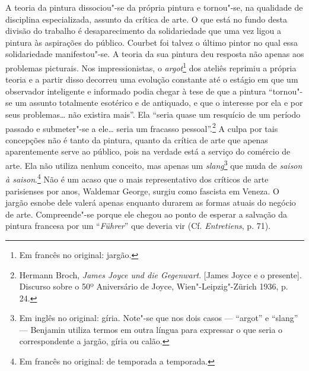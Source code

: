 A teoria da pintura dissociou"-se da própria pintura e tornou"-se, na
qualidade de disciplina especializada, assunto da crítica de arte. O que
está no fundo desta divisão do trabalho é desaparecimento da
solidariedade que uma vez ligou a pintura às aspirações do público.
Courbet foi talvez o último pintor no qual essa solidariedade
manifestou"-se. A teoria da sua pintura deu resposta não apenas aos
problemas picturais. Nos impressionistas, o \emph{argot}\footnote{Em francês no original: jargão. \versal{[N. T.]}} dos ateliês reprimiu a própria teoria
e a partir disso decorreu uma evolução constante até o
estágio em que um observador inteligente e informado podia chegar à tese
de que a pintura ``tornou"-se um assunto totalmente esotérico e
de antiquado, e que o interesse por ela e por seus problemas\ldots{} não
existira mais''. Ela ``seria quase um resquício de um período passado e
submeter"-se a ele\ldots{} seria um fracasso pessoal''.\footnote{Hermann Broch, \emph{James
  Joyce und die Gegenwart}. {[}James Joyce e o presente{]}. Discurso
  sobre o 50º Aniversário de Joyce, Wien"-Leipzig"-Zürich 1936, p. 24.} A
culpa por tais concepções não é tanto da pintura, quanto da crítica de
arte que apenas aparentemente serve ao público, pois na verdade está a
serviço do comércio de arte. Ela não utiliza nenhum conceito, mas apenas
um \emph{slang}\footnote{Em inglês no original: gíria. Note"-se que
  nos dois casos --- ``argot'' e ``slang'' --- Benjamin utiliza termos em
  outra língua para expressar o que seria o correspondente a jargão,
  gíria ou calão. \versal{[N. T.]}} que muda de \emph{saison à saison}.\footnote{Em francês no original: de temporada a temporada. \versal{[N. T.]}} Não é um acaso que
o mais representativo dos críticos de arte parisienses por anos,
Waldemar George, surgiu como fascista em Veneza. O jargão esnobe dele
valerá apenas enquanto durarem as formas atuais do negócio de arte.
Compreende"-se porque ele chegou ao ponto de esperar a salvação da
pintura francesa por um ``\emph{Führer}'' que deveria vir (Cf.
\emph{Entretiens}, p. 71).

